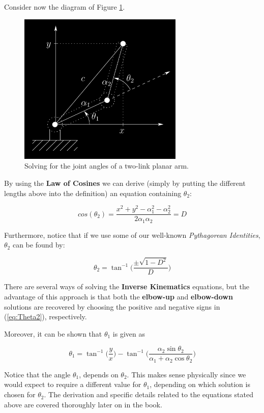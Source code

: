 Consider now the diagram of Figure \ref{fig:Figure1_27}.

\begin{figure}[H]
	\centering
	\includegraphics[width=0.7\textwidth]{img/Figure1_27.png}
	\caption{Solving for the joint angles of a two-link planar arm.}
	\label{fig:Figure1_27}
\end{figure}

By using the \textbf{Law of Cosines} we can derive (simply by putting the different lengths above into the definition) an equation containing $\theta_2$:

\begin{equation} \label{eq:LawOfCos}
	cos(\theta_2) = \frac{x^2 + y^2 - \alpha_1^2 - \alpha_2^2}{2\alpha_1\alpha_2} = D
\end{equation}

Furthermore, notice that if we use some of our well-known \emph{Pythagorean Identities}, $\theta_2$ can be found by:

\begin{equation} \label{eq:Theta2}
	\theta_2 = \tan^{-1}{\bigg(\frac{\pm\sqrt{1-D^2}}{D}\bigg)}
\end{equation}

There are several ways of solving the \textbf{Inverse Kinematics} equations, but the advantage of this approach is that both the \textbf{elbow-up} and \textbf{elbow-down} solutions are recovered by choosing the positive and negative signs in (\ref{eq:Theta2}), respectively.

Moreover, it can be shown that $\theta_1$ is given as

\begin{equation} \label{eq:Theta1}
	\theta_1 = \tan^{-1}{\bigg(\frac{y}{x}}\bigg) - \tan^{-1}{\bigg(\frac{\alpha_2\sin{\theta_2}}{\alpha_1 + \alpha_2\cos{\theta_2}}\bigg)}
\end{equation}

Notice that the angle $\theta_1$, depends on $\theta_2$. This makes sense physically since we would
expect to require a different value for $\theta_1$, depending on which solution is chosen for $\theta_2$.
The derivation and specific details related to the equations stated above are covered thoroughly later on in the book.
